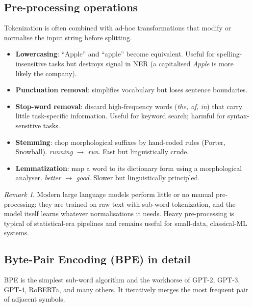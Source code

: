 \documentclass[12pt,a4paper]{report}
\theoremstyle{definition}
\theoremstyle{remark}
\newtheorem{remark}{Remark}[section]
\begin{document}
\subsection{Pre-processing operations}

Tokenization is often combined with ad-hoc transformations that modify or normalise the input string before splitting.

\begin{itemize}
    \item \textbf{Lowercasing}: ``Apple'' and ``apple'' become equivalent. Useful for spelling-insensitive tasks but destroys signal in NER (a capitalised \emph{Apple} is more likely the company).
    \item \textbf{Punctuation removal}: simplifies vocabulary but loses sentence boundaries.
    \item \textbf{Stop-word removal}: discard high-frequency words (\emph{the, of, in}) that carry little task-specific information. Useful for keyword search; harmful for syntax-sensitive tasks.
    \item \textbf{Stemming}: chop morphological suffixes by hand-coded rules (Porter, Snowball). \emph{running} $\to$ \emph{run}. Fast but linguistically crude.
    \item \textbf{Lemmatization}: map a word to its dictionary form using a morphological analyser. \emph{better} $\to$ \emph{good}. Slower but linguistically principled.
\end{itemize}

\begin{remark}
Modern large language models perform little or no manual pre-processing: they are trained on raw text with sub-word tokenization, and the model itself learns whatever normalisations it needs. Heavy pre-processing is typical of statistical-era pipelines and remains useful for small-data, classical-ML systems.
\end{remark}

\subsection{Byte-Pair Encoding (BPE) in detail}

BPE is the simplest sub-word algorithm and the workhorse of GPT-2, GPT-3, GPT-4, RoBERTa, and many others. It iteratively merges the most frequent pair of adjacent symbols.
\end{document}
